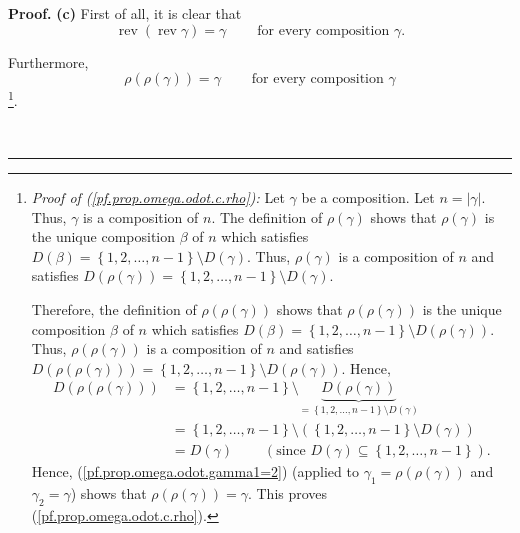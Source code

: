 \documentclass[numbers=enddot,12pt,final,onecolumn,notitlepage,abstracton]{scrartcl}%
\theoremstyle{definition}
\newenvironment{proof}[1][Proof]{\noindent\textbf{#1.} }{\ \rule{0.5em}{0.5em}}
\newenvironment{verlong}{}{}
\begin{document}
\begin{verlong}
\begin{proof}
\textbf{(c)} First of all, it is clear that%
\begin{equation}
\operatorname*{rev}\left(  \operatorname*{rev}\gamma\right)  =\gamma
\ \ \ \ \ \ \ \ \ \ \text{for every composition }\gamma.
\label{pf.prop.omega.odot.c.rev}%
\end{equation}


Furthermore,%
\begin{equation}
\rho\left(  \rho\left(  \gamma\right)  \right)  =\gamma
\ \ \ \ \ \ \ \ \ \ \text{for every composition }\gamma
\label{pf.prop.omega.odot.c.rho}%
\end{equation}
\footnote{\textit{Proof of (\ref{pf.prop.omega.odot.c.rho}):} Let $\gamma$ be
a composition. Let $n=\left\vert \gamma\right\vert $. Thus, $\gamma$ is a
composition of $n$. The definition of $\rho\left(  \gamma\right)  $ shows that
$\rho\left(  \gamma\right)  $ is the unique composition $\beta$ of $n$ which
satisfies $D\left(  \beta\right)  =\left\{  1,2,\ldots,n-1\right\}  \setminus
D\left(  \gamma\right)  $. Thus, $\rho\left(  \gamma\right)  $ is a
composition of $n$ and satisfies $D\left(  \rho\left(  \gamma\right)  \right)
=\left\{  1,2,\ldots,n-1\right\}  \setminus D\left(  \gamma\right)  $.
\par
Therefore, the definition of $\rho\left(  \rho\left(  \gamma\right)  \right)
$ shows that $\rho\left(  \rho\left(  \gamma\right)  \right)  $ is the unique
composition $\beta$ of $n$ which satisfies $D\left(  \beta\right)  =\left\{
1,2,\ldots,n-1\right\}  \setminus D\left(  \rho\left(  \gamma\right)  \right)
$. Thus, $\rho\left(  \rho\left(  \gamma\right)  \right)  $ is a composition
of $n$ and satisfies $D\left(  \rho\left(  \rho\left(  \gamma\right)  \right)
\right)  =\left\{  1,2,\ldots,n-1\right\}  \setminus D\left(  \rho\left(
\gamma\right)  \right)  $. Hence,%
\begin{align*}
D\left(  \rho\left(  \rho\left(  \gamma\right)  \right)  \right)   &
=\left\{  1,2,\ldots,n-1\right\}  \setminus\underbrace{D\left(  \rho\left(
\gamma\right)  \right)  }_{=\left\{  1,2,\ldots,n-1\right\}  \setminus
D\left(  \gamma\right)  }\\
&  =\left\{  1,2,\ldots,n-1\right\}  \setminus\left(  \left\{  1,2,\ldots
,n-1\right\}  \setminus D\left(  \gamma\right)  \right) \\
&  =D\left(  \gamma\right)  \ \ \ \ \ \ \ \ \ \ \left(  \text{since }D\left(
\gamma\right)  \subseteq\left\{  1,2,\ldots,n-1\right\}  \right)  .
\end{align*}
Hence, (\ref{pf.prop.omega.odot.gamma1=2}) (applied to $\gamma_{1}=\rho\left(
\rho\left(  \gamma\right)  \right)  $ and $\gamma_{2}=\gamma$) shows that
$\rho\left(  \rho\left(  \gamma\right)  \right)  =\gamma$. This proves
(\ref{pf.prop.omega.odot.c.rho}).}.


\end{proof}
\end{verlong}
\end{document}
